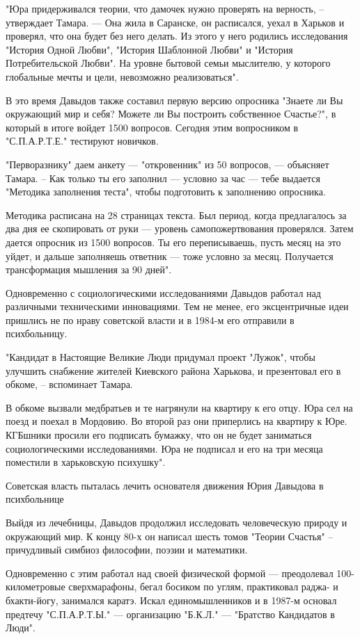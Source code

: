 "Юра придерживался теории, что дамочек нужно проверять на верность, –
утверждает Тамара. --- Она жила в Саранске, он расписался, уехал в Харьков и
проверял, что она будет без него делать. Из этого у него родились исследования
"История Одной Любви", "История Шаблонной Любви" и "История Потребительской
Любви". На уровне бытовой семьи мыслителю, у которого глобальные мечты и цели,
невозможно реализоваться".

В это время Давыдов также составил первую версию опросника "Знаете ли Вы
окружающий мир и себя? Можете ли Вы построить собственное Счастье?", в который
в итоге войдет 1500 вопросов. Сегодня этим вопросником в "С.П.А.Р.Т.Е."
тестируют новичков.

"Перворазнику" даем анкету --- "откровенник" из 50 вопросов, --- объясняет Тамара.
– Как только ты его заполнил --- условно за час --- тебе выдается "Методика
заполнения теста", чтобы подготовить к заполнению опросника.

Методика расписана на 28 страницах текста. Был период, когда предлагалось за
два дня ее скопировать от руки --- уровень самопожертвования проверялся. Затем
дается опросник из 1500 вопросов. Ты его переписываешь, пусть месяц на это
уйдет, и дальше заполняешь ответник --- тоже условно за месяц. Получается
трансформация мышления за 90 дней".

Одновременно с социологическими исследованиями Давыдов работал над различными
техническими инновациями. Тем не менее, его эксцентричные идеи пришлись не по
нраву советской власти и в 1984-м его отправили в психбольницу.

"Кандидат в Настоящие Великие Люди придумал проект "Лужок", чтобы улучшить
снабжение жителей Киевского района Харькова, и презентовал его в обкоме, –
вспоминает Тамара. 

В обкоме вызвали медбратьев и те нагрянули на квартиру к его отцу. Юра сел на
поезд и поехал в Мордовию. Во второй раз они приперлись на квартиру к Юре.
КГБшники просили его подписать бумажку, что он не будет заниматься
социологическими исследованиями. Юра не подписал и его на три месяца поместили
в харьковскую психушку".

Советская власть пыталась лечить основателя движения Юрия Давыдова в психбольнице

Выйдя из лечебницы, Давыдов продолжил исследовать человеческую природу и
окружающий мир. К концу 80-х он написал шесть томов "Теории Счастья" –
причудливый симбиоз философии, поэзии и математики. 

Одновременно с этим работал над своей физической формой --- преодолевал
100-километровые сверхмарафоны, бегал босиком по углям, практиковал раджа- и
бхакти-йогу, занимался каратэ. Искал единомышленников и в 1987-м основал
предтечу "С.П.А.Р.Т.Ы." --- организацию "Б.К.Л." --- "Братство Кандидатов в Люди".

